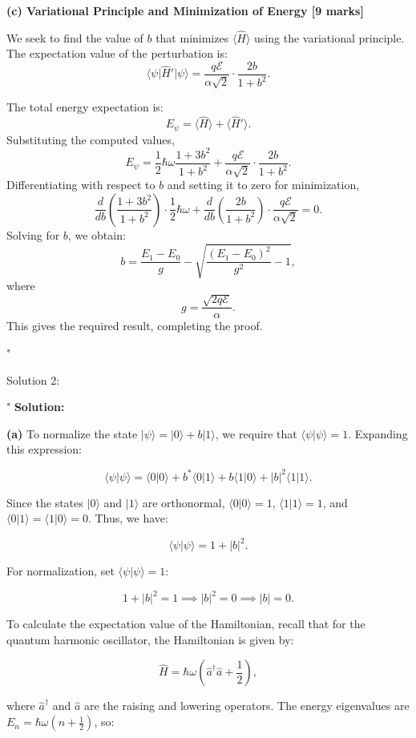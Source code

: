 \textbf{(c) Variational Principle and Minimization of Energy [9 marks]}

We seek to find the value of \( b \) that minimizes \( \langle \hat{H} \rangle \) using the variational principle. The expectation value of the perturbation is:
\[
\langle \psi \vert \hat{H}' \vert \psi \rangle = \frac{q\mathcal{E}}{\alpha \sqrt{2}} \cdot \frac{2b}{1 + b^2}.
\]

The total energy expectation is:
\[
E_{\psi} = \langle \hat{H} \rangle + \langle \hat{H}' \rangle.
\]
Substituting the computed values,
\[
E_{\psi} = \frac{1}{2} \hbar \omega \frac{1 + 3b^2}{1 + b^2} + \frac{q\mathcal{E}}{\alpha \sqrt{2}} \cdot \frac{2b}{1 + b^2}.
\]
Differentiating with respect to \( b \) and setting it to zero for minimization,
\[
\frac{d}{db} \left( \frac{1 + 3b^2}{1 + b^2} \right) \cdot \frac{1}{2} \hbar \omega + \frac{d}{db} \left( \frac{2b}{1 + b^2} \right) \cdot \frac{q\mathcal{E}}{\alpha \sqrt{2}} = 0.
\]
Solving for \( b \), we obtain:
\[
 b = \frac{E_1 - E_0}{g} - \sqrt{\frac{(E_1 - E_0)^2}{g^2} - 1},
\]
where
\[
 g = \frac{\sqrt{2q\mathcal{E}}}{\alpha}.
\]
This gives the required result, completing the proof.

"

Solution 2: 

"
\textbf{Solution:}

\textbf{(a)} To normalize the state \(|\psi\rangle = |0\rangle + b|1\rangle\), we require that \(\langle \psi | \psi \rangle = 1\). Expanding this expression:

\[
\langle \psi | \psi \rangle = \langle 0 | 0 \rangle + b^* \langle 0 | 1 \rangle + b \langle 1 | 0 \rangle + |b|^2 \langle 1 | 1 \rangle.
\]

Since the states \(|0\rangle\) and \(|1\rangle\) are orthonormal, \(\langle 0 | 0 \rangle = 1\), \(\langle 1 | 1 \rangle = 1\), and \(\langle 0 | 1 \rangle = \langle 1 | 0 \rangle = 0\). Thus, we have:

\[
\langle \psi | \psi \rangle = 1 + |b|^2.
\]

For normalization, set \(\langle \psi | \psi \rangle = 1\):

\[
1 + |b|^2 = 1 \implies |b|^2 = 0 \implies |b| = 0.
\]

To calculate the expectation value of the Hamiltonian, recall that for the quantum harmonic oscillator, the Hamiltonian is given by:

\[
\hat{H} = \hbar \omega \left( \hat{a}^\dagger \hat{a} + \frac{1}{2} \right),
\]

where \(\hat{a}^\dagger\) and \(\hat{a}\) are the raising and lowering operators. The energy eigenvalues are \(E_n = \hbar \omega \left( n + \frac{1}{2} \right)\), so:

